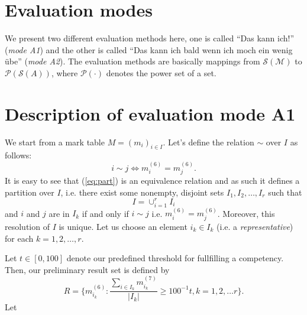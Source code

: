 \documentclass{scrartcl}
\begin{document}
\section{Evaluation modes}
We present two different evaluation methods here, one is called ``Das kann ich!'' (\emph{mode A1}) and the other is called ``Das kann ich bald wenn ich moch ein wenig übe'' (\emph{mode A2}). The evaluation methods are basically mappings from $\mathcal{S}({\mathcal{M}})$ to $\mathcal{P}({\mathcal{S}(A)})$, where $\mathcal{P}(\cdot)$ denotes the power set of a set.

\section{Description of evaluation mode A1}
We start from a mark table $M=(m_i)_{i\in I}$. Let's define the relation $\sim$ over $I$ as follows:
\begin{equation}
i\sim j \Leftrightarrow m_i^{(6)}=m_j^{(6)}.
\label{eq:part}
\end{equation}
It is easy to see that (\ref{eq:part}) is an equivalence relation and as such it defines a partition over $I$, i.e. there exist some nonempty, disjoint sets $I_1,I_2,\ldots,I_r$ such that $$I=\cup_{i=1}^r I_i$$ and $i$ and $j$ are in $I_k$ if and only if $i\sim j$ i.e. $m_i^{(6)}=m_j^{(6)}$. Moreover, this resolution of $I$ is unique. Let us choose an element $i_k\in I_k$ (i.e. a \emph{representative}) for each $k=1,2,\ldots,r$.

Let $t\in [0,100]$ denote our predefined threshold for fullfilling a competency. Then, our preliminary result set is defined by 
$$R=\{m_{i_k}^{(6)}: \frac{\sum_{i \in I_k}m_{i_k}^{(7)}}{|I_k|}\geq 100^{-1}t, k=1,2,\ldots r\}.$$
Let 
\end{document}
